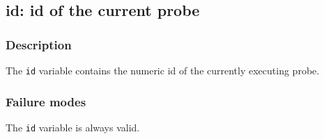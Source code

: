 \clearpage
{}
{}
\label{vars:id}
\subsection*{id:  id of the current probe}

\subsubsection*{Description}

The \verb|id| variable contains the numeric id of the currently
executing probe.

\subsubsection*{Failure modes}

The \verb|id| variable is always valid.
